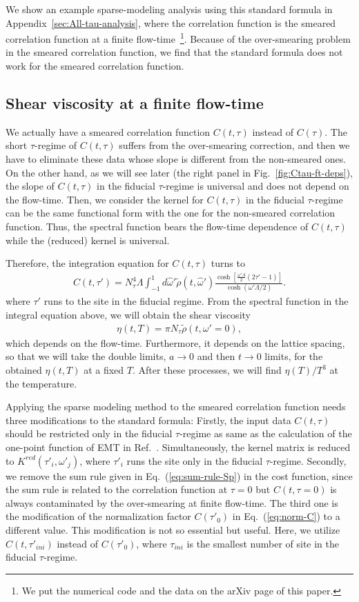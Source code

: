 \documentclass[a4paper,11pt]{article}
\newcommand\beq{ \begin{eqnarray} }
\newcommand\eeq{ \end{eqnarray} }
\begin{document}
We show an example sparse-modeling analysis using this standard formula in Appendix~\ref{sec:All-tau-analysis}, where 
 the correlation function is the smeared correlation function at a finite flow-time~\footnote{We put the numerical code and the data on the arXiv page of this paper.}.
Because of the over-smearing problem in the smeared correlation function, we find that the standard formula does not work for the smeared correlation function.


\subsection{Shear viscosity at a finite flow-time}\label{sec:tech-step}
We actually have a smeared correlation function $C(t,\tau)$ instead of $C(\tau)$.
The short $\tau$-regime of $C(t,\tau)$ suffers from the over-smearing correction, and then we have to eliminate these data whose slope is different from the non-smeared ones.
On the other hand, as we will see later (the right panel in Fig.~\ref{fig:Ctau-ft-deps}), the slope of $C(t,\tau)$ in the fiducial $\tau$-regime is universal and does not depend on the flow-time.
Then, we consider the kernel for $C(t,\tau)$ in the fiducial $\tau$-regime can be the same functional form with the one for the non-smeared correlation function.
Thus, the spectral function bears the flow-time dependence of $C(t,\tau)$ while the (reduced) kernel is universal.

Therefore, the integration equation for $C(t,\tau)$ turns to
\beq
C(t, \tau') = N_\tau ^4 \Lambda \int_{-1}^1 d \hat{\omega}' \tilde{\rho}(t, \hat{\omega}') \frac{\cosh [\frac{\omega ' \Lambda }{2} (2 \tau' -1)]}{\cosh (\omega ' \Lambda /2)}.
\eeq
where $\tau'$ runs to the site in the fiducial regime.
From the spectral function in the integral equation above, we will obtain the shear viscosity
\beq
\eta (t,T) = \pi {N_\tau} \tilde{\rho} (t,\omega'=0),\label{eq:eta-t}
\eeq
which depends on the flow-time.
Furthermore, it depends on the lattice spacing, so that we will take the double limits, $a\rightarrow 0$ and then $t \rightarrow 0$ limits, for the obtained $\eta(t,T)$ at a fixed $T$.
After these processes, we will find $\eta(T)/T^3$ at the temperature.


Applying the  sparse modeling method to the smeared correlation function needs three modifications to the standard formula:
Firstly, the input data $C(t,\tau)$ should be restricted only in the fiducial $\tau$-regime as same as the calculation of the one-point function of EMT in Ref.~\cite{Asakawa:2013laa}.
Simultaneously, the kernel matrix is reduced to $K^{red}(\tau'_i,\omega'_j)$, where $\tau'_i$ runs the site only in the fiducial $\tau$-regime.
Secondly, we remove the sum rule given in Eq.~(\ref{eq:sum-rule-Sp}) in the cost function, since the sum rule is related to the correlation function at $\tau=0$ but $C(t,\tau=0)$ is always contaminated by the over-smearing at  finite flow-time.
The third one is the modification of the normalization factor $C(\tau'_0)$ in Eq.~(\ref{eq:norm-C}) to a different value. This modification is not so essential but useful.
Here, we utilize $C(t,\tau'_{ini})$ instead of $C(\tau'_0)$, where $\tau_{ini}$ is the smallest number of site in the fiducial $\tau$-regime.
\end{document}

